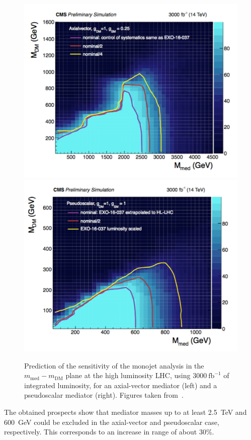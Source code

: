\begin{figure}[ht]
  \centering
 \includegraphics[width=.49\textwidth]{monojet_axial}
 \includegraphics[width=.49\textwidth]{monojet_pseudoscalar}
 \caption{Prediction of the sensitivity of the monojet analysis in the $m_{\mathrm{med}}-m_{\mathrm{DM}}$ plane at the high luminosity \ac{LHC}, using $3000\ \mathrm{fb}^{-1}$ of integrated luminosity, for an axial-vector mediator (left) and a pseudoscalar mediator (right). Figures taken from~\cite{CMS-DP-2016-064}.}
 \label{fig:monojet_HLLHC}
\end{figure}

The obtained prospects show that mediator masses up to at least \SI{2.5}{TeV} and \SI{600}{GeV} could be excluded in the axial-vector and pseudoscalar case, respectively. This corresponds to an increase in range of about 30\%.

